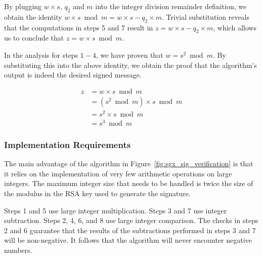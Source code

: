 By plugging $w \times s$, $q_2$ and $m$ into the integer division remainder
definition, we obtain the identity
$w \times s \bmod m = w \times s - q_2 \times m$. Trivial substitution reveals
that the computations in steps 5 and 7 result in
$z = w \times s - q_2 \times m$, which allows us to conclude that
$z = w \times s \bmod m$.

In the analysis for steps $1 - 4$, we have proven that $w = s ^ 2 \bmod m$. By
substituting this into the above identity, we obtain the proof that the
algorithm's output is indeed the desired signed message.

\begin{align*}
z & = w \times s \bmod m \\
  & = (s^2 \bmod m) \times s \bmod m \\
  & = s^2 \times s \bmod m \\
  & = s^3 \bmod m
\end{align*}


\subsubsection{Implementation Requirements}

The main advantage of the algorithm in Figure~\ref{fig:sgx_sig_verification} is
that it relies on the implementation of very few arithmetic operations on large
integers. The maximum integer size that needs to be handled is twice the size
of the modulus in the RSA key used to generate the signature.

Steps 1 and 5 use large integer multiplication. Steps 3 and 7 use integer
subtraction. Steps 2, 4, 6, and 8 use large integer comparison. The checks in
steps 2 and 6 guarantee that the results of the subtractions performed in steps
3 and 7 will be non-negative. It follows that the algorithm will never
encounter negative numbers.
